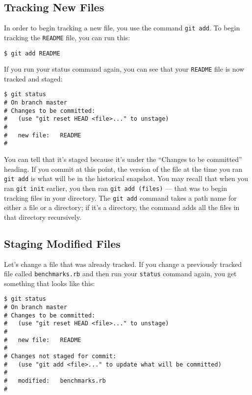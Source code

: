 \documentclass[a4paper]{book}
\begin{document}
\subsection{Tracking New Files}

In order to begin tracking a new file, you use the command \texttt{git add}. To begin tracking the \texttt{README} file, you can run this:

\begin{shaded}\begin{verbatim}
$ git add README
\end{verbatim}\end{shaded}

If you run your status command again, you can see that your \texttt{README} file is now tracked and staged:

\begin{shaded}\begin{verbatim}
$ git status
# On branch master
# Changes to be committed:
#   (use "git reset HEAD <file>..." to unstage)
#
#	new file:   README
#
\end{verbatim}\end{shaded}

You can tell that it's staged because it's under the “Changes to be committed” heading. If you commit at this point, the version of the file at the time you ran \texttt{git add} is what will be in the historical snapshot. You may recall that when you ran \texttt{git init} earlier, you then ran \texttt{git add (files)} --- that was to begin tracking files in your directory. The \texttt{git add} command takes a path name for either a file or a directory; if it's a directory, the command adds all the files in that directory recursively.

\subsection{Staging Modified Files}

Let's change a file that was already tracked. If you change a previously tracked file called \texttt{benchmarks.rb} and then run your \texttt{status} command again, you get something that looks like this:

\begin{shaded}\begin{verbatim}
$ git status
# On branch master
# Changes to be committed:
#   (use "git reset HEAD <file>..." to unstage)
#
#	new file:   README
#
# Changes not staged for commit:
#   (use "git add <file>..." to update what will be committed)
#
#	modified:   benchmarks.rb
#
\end{verbatim}\end{shaded}
\end{document}
